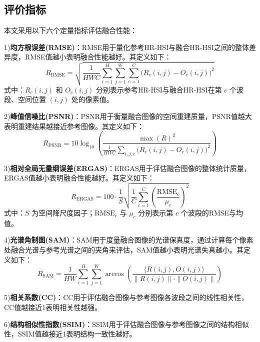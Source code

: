 \documentclass[UTF8,a4paper,11pt]{ctexart}
\begin{document}
\subsection{评价指标}
本文采用以下六个定量指标评估融合性能：

1)\textbf{均方根误差(RMSE)}：RMSE用于量化参考HR-HSI与融合HR-HSI之间的整体差异度，RMSE值越小表明融合性能越好。其定义如下：
\begin{equation}
  R_{\mathrm{RMSE}} = \sqrt{\frac{1}{HWC} \sum_{i=1}^{H} \sum_{j=1}^{W} \sum_{c=1}^{C} \bigl(R_c(i,j) - O_c(i,j)\bigr)^2}
  \label{eq:rmse}
\end{equation}
式中：$R_c(i,j)$ 和 $O_c(i,j)$ 分别表示参考HR-HSI与融合HR-HSI在第 $c$ 个波段、空间位置 $(i,j)$ 处的像素值。

2)\textbf{峰值信噪比(PSNR)}：PSNR用于衡量融合图像的空间重建质量，PSNR值越大表明重建结果越接近参考图像。其定义如下：
\begin{equation}
  R_{\mathrm{PSNR}} = 10 \log_{10}\!\left( \frac{\max(R)^2}{\frac{1}{HWC} \sum_{i,j,c} \bigl(R_c(i,j) - O_c(i,j)\bigr)^2} \right)
  \label{eq:psnr}
\end{equation}

3)\textbf{相对全局无量纲误差(ERGAS)}：ERGAS用于评估融合图像的整体统计质量，ERGAS值越小表明融合性能越好。其定义如下：
\begin{equation}
  R_{\mathrm{ERGAS}} = 100 \cdot \frac{1}{S} \sqrt{\frac{1}{C} \sum_{c=1}^{C} \left( \frac{\mathrm{RMSE}_c}{\mu_c} \right)^2}
  \label{eq:ergas}
\end{equation}
式中：$S$ 为空间降尺度因子；$\mathrm{RMSE}_c$ 与 $\mu_c$ 分别表示第 $c$ 个波段的RMSE与均值。

4)\textbf{光谱角制图(SAM)}：SAM用于度量融合图像的光谱保真度，通过计算每个像素处融合光谱与参考光谱之间的夹角来评估，SAM值越小表明光谱失真越小。其定义如下：
\begin{equation}
  R_{\mathrm{SAM}} = \frac{1}{HW} \sum_{i=1}^{H} \sum_{j=1}^{W} \arccos\!\left( \frac{\langle R(i,j), O(i,j) \rangle}{\|R(i,j)\| \cdot \|O(i,j)\|} \right)
  \label{eq:sam}
\end{equation}

5)\textbf{相关系数(CC)}：CC用于评估融合图像与参考图像各波段之间的线性相关性，CC值越接近1表明相关性越强。

6)\textbf{结构相似性指数(SSIM)}：SSIM用于评估融合图像与参考图像之间的结构相似性，SSIM值越接近1表明结构一致性越好。

\end{document}
